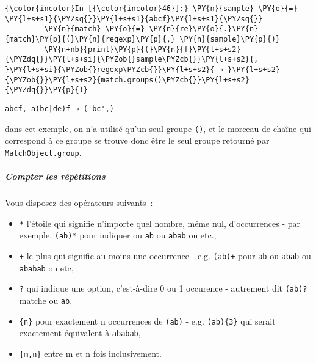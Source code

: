     \begin{Verbatim}[commandchars=\\\{\},frame=single,framerule=0.3mm,rulecolor=\color{cellframecolor}]
{\color{incolor}In [{\color{incolor}46}]:} \PY{n}{sample} \PY{o}{=} \PY{l+s+s1}{\PYZsq{}}\PY{l+s+s1}{abcf}\PY{l+s+s1}{\PYZsq{}}
         \PY{n}{match} \PY{o}{=} \PY{n}{re}\PY{o}{.}\PY{n}{match}\PY{p}{(}\PY{n}{regexp}\PY{p}{,} \PY{n}{sample}\PY{p}{)}
         \PY{n+nb}{print}\PY{p}{(}\PY{n}{f}\PY{l+s+s2}{\PYZdq{}}\PY{l+s+si}{\PYZob{}sample\PYZcb{}}\PY{l+s+s2}{, }\PY{l+s+si}{\PYZob{}regexp\PYZcb{}}\PY{l+s+s2}{ → }\PY{l+s+s2}{\PYZob{}}\PY{l+s+s2}{match.groups()\PYZcb{}}\PY{l+s+s2}{\PYZdq{}}\PY{p}{)}
\end{Verbatim}


    \begin{Verbatim}[commandchars=\\\{\},frame=single,framerule=0.3mm,rulecolor=\color{cellframecolor}]
abcf, a(bc|de)f → ('bc',)
\end{Verbatim}

    dans cet exemple, on n'a utilisé qu'un seul groupe \texttt{()}, et le
morceau de chaîne qui correspond à ce groupe se trouve donc être le seul
groupe retourné par \texttt{MatchObject.group}.

    \hypertarget{compter-les-ruxe9puxe9titions}{%
\subparagraph{Compter les
répétitions}\label{compter-les-ruxe9puxe9titions}}

    Vous disposez des opérateurs suivants~:

\begin{itemize}
\tightlist
\item
  \texttt{*} l'étoile qui signifie n'importe quel nombre, même nul,
  d'occurrences - par exemple, \texttt{(ab)*} pour indiquer
  \texttt{\textquotesingle{}\textquotesingle{}} ou
  \texttt{\textquotesingle{}ab\textquotesingle{}} ou
  \texttt{\textquotesingle{}abab\textquotesingle{}} ou etc.,
\item
  \texttt{+} le plus qui signifie au moins une occurrence - e.g.
  \texttt{(ab)+} pour \texttt{ab} ou \texttt{abab} ou \texttt{ababab} ou
  etc,
\item
  \texttt{?} qui indique une option, c'est-à-dire 0 ou 1 occurence -
  autrement dit \texttt{(ab)?} matche
  \texttt{\textquotesingle{}\textquotesingle{}} ou \texttt{ab},
\item
  \texttt{\{n\}} pour exactement n occurrences de \texttt{(ab)} - e.g.
  \texttt{(ab)\{3\}} qui serait exactement équivalent à \texttt{ababab},
\item
  \texttt{\{m,n\}} entre m et n fois inclusivement.
\end{itemize}

